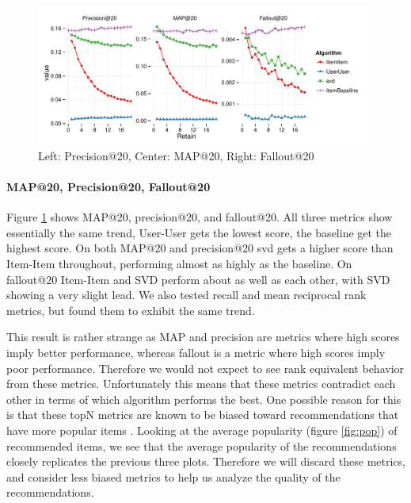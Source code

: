 \documentclass[letterpaper]{sig-alternate}
\begin{document}


\begin{figure}[ht!]
  \centering
  \includegraphics[width=\linewidth]{../lenskit/output/ekstrandTuned20/TopNPrecision.pdf}
  \caption{Left: Precision@20, Center: MAP@20, Right: Fallout@20}
  \label{fig:map}
\end{figure}
\paragraph{MAP@20, Precision@20, Fallout@20}
  Figure \ref{fig:map} shows MAP@20, precision@20, and fallout@20.
  All three metrics show essentially the same trend, User-User gets the lowest score, the baseline get the highest score.
  On both MAP@20 and precision@20 svd gets a higher score than Item-Item throughout, performing almost as highly as the baseline.
  On fallout@20 Item-Item and SVD perform about as well as each other, with SVD showing a very slight lead.
  We also tested recall and mean reciprocal rank metrics, but found them to exhibit the same trend.

  This result is rather strange as MAP and precision are metrics where high scores imply better performance, whereas fallout is a metric where high scores imply poor performance.
  Therefore we would not expect to see rank equivalent behavior from these metrics.
  Unfortunately this means that these metrics contradict each other in terms of which algorithm performs the best.
  One possible reason for this is that these topN metrics are known to be biased toward recommendations that have more popular items \cite{bellogin}.
  Looking at the average popularity (figure \ref{fig:pop}) of recommended items, we see that the average popularity of the recommendations closely replicates the previous three plots.
  Therefore we will discard these metrics, and consider less biased metrics to help us analyze the quality of the recommendations.
\end{document}
